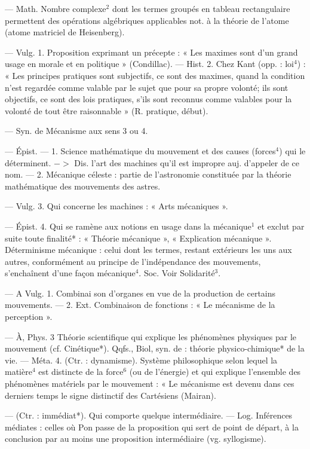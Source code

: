 \begin{itemize}[leftmargin=1cm, label=, itemsep=1pt]
 — Math. Nombre complexe$^2$
dont les termes groupés en tableau
rectangulaire permettent des opérations algébriques applicables not. à
la théorie de l'atome (atome matriciel de Heisenberg).

 — Vulg. 1. Proposition exprimant un précepte : « Les maximes
sont d’un grand usage en morale et
en politique » (Condillac). — Hist.
2. Chez Kant (opp. : loi$^4$) : « Les principes pratiques sont subjectifs, ce
sont des maximes, quand la condition n’est regardée comme valable
par le sujet que pour sa propre volonté; ils sont objectifs, ce sont des
lois pratiques, s’ils sont reconnus
comme valables pour la volonté de
tout être raisonnable » (R. pratique,
début).

 — Syn. de Mécanisme
aux sens 3 ou 4.

 — Épist. — 1. Science
mathématique du mouvement et des
causes (forces$^4$) qui le déterminent.
$->$ Dis. l'art des machines qu'il
est impropre auj. d’appeler de ce
nom. — 2. Mécanique céleste : partie
de l'astronomie constituée par la
théorie mathématique des mouvements des astres.

 — Vulg. 3. Qui concerne les machines : « Arts mécaniques ».

— Épist. 4. Qui se ramène aux
notions en usage dans la mécanique$^1$
et exclut par suite toute finalité* :
« Théorie mécanique », « Explication mécanique ». Déterminisme
mécanique : celui dont les termes,
restant extérieurs les uns aux autres,
conformément au principe de l’indépendance des mouvements, s’enchaînent d’une façon mécanique$^4$.
Soc. Voir Solidarité$^3$.

 — A Vulg. 1. Combinai
son d'organes en vue de la production de certains mouvements. —
2. Ext. Combinaison de fonctions :
« Le mécanisme de la perception ».

— À, Phys. 3 Théorie scientifique qui explique les phénomènes
physiques par le mouvement (cf.
Cinétique*). Qqfs., Biol, syn. de :
théorie physico-chimique* de la vie.
— Méta. 4. (Ctr. : dynamisme).
Système philosophique selon lequel
la matière$^4$ est distincte de la force$^6$
(ou de l'énergie) et qui explique
l’ensemble des phénomènes matériels par le mouvement : « Le mécanisme est devenu dans ces derniers
temps le signe distinctif des Cartésiens (Mairan).

 — (Ctr. : immédiat*). Qui
comporte quelque intermédiaire. —
Log. Inférences médiates : celles où
Pon passe de la proposition qui sert
de point de départ, à la conclusion
par au moins une proposition intermédiaire (vg. syllogisme).


\end{itemize}
